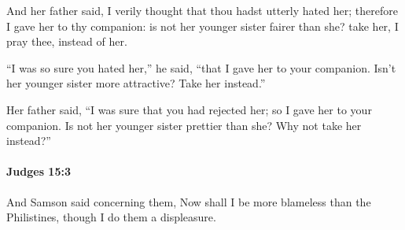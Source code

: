 			\begin{versebox}
					\item[BHS] 
					\item[ASV] And her father said, I verily thought that thou hadst utterly hated her; therefore I gave her to thy companion: is not her younger sister fairer than she? take her, I pray thee, instead of her.
					\item[NIV] “I was so sure you hated her,” he said, “that I gave her to your companion. Isn’t her younger sister more attractive? Take her instead.”
					\item[NRSV] Her father said, “I was sure that you had rejected her; so I gave her to your companion. Is not her younger sister prettier than she? Why not take her instead?”
			\end{versebox}

		\paragraph{Judges 15:3} %
			\label{JUDGES-15-3}

			And Samson said concerning them, Now shall I be more blameless than the Philistines, though I do them a displeasure.


